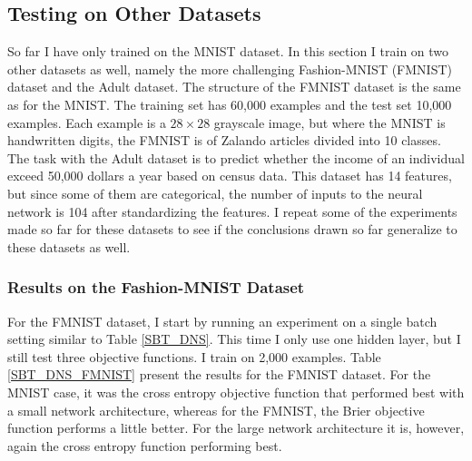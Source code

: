 
\subsection{Testing on Other Datasets}
So far I have only trained on the MNIST dataset. In this section I train on two other datasets as well, namely the more challenging Fashion-MNIST (FMNIST) dataset and the Adult dataset. The structure of the FMNIST dataset is the same as for the MNIST. The training set has 60,000 examples and the test set 10,000 examples. Each example is a $28 \times 28$ grayscale image, but where the MNIST is handwritten digits, the FMNIST is of Zalando articles divided into 10 classes. The task with the Adult dataset is to predict whether the income of an individual exceed 50,000 dollars a year based on census data. This dataset has 14 features, but since some of them are categorical, the number of inputs to the neural network is 104 after standardizing the features. I repeat some of the experiments made so far for these datasets to see if the conclusions drawn so far generalize to these datasets as well. 

\subsubsection{Results on the Fashion-MNIST Dataset}
For the FMNIST dataset, I start by running an experiment on a single batch setting similar to Table \ref{SBT_DNS}. This time I only use one hidden layer, but I still test three objective functions. I train on 2,000 examples. Table \ref{SBT_DNS_FMNIST} present the results for the FMNIST dataset. For the MNIST case, it was the cross entropy objective function that performed best with a small network architecture, whereas for the FMNIST, the Brier objective function performs a little better. For the large network architecture it is, however, again the cross entropy function performing best. 


